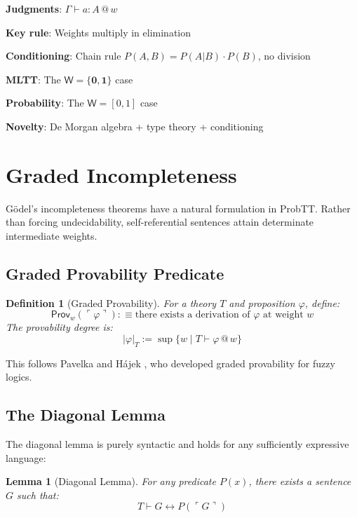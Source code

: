 \documentclass[11pt,a4paper]{article}
\makeatletter
\newtheorem{definition}{Definition}[section]
\newtheorem{lemma}[theorem]{Lemma}
\newcommand{\W}{\mathsf{W}}
\newcommand{\at}[1]{\,@\,#1}
\newcommand{\one}{\mathbf{1}}
\newcommand{\zero}{\mathbf{0}}
\makeatother
\begin{document}
\textbf{Judgments}: $\Gamma \vdash a : A \at{w}$

\textbf{Key rule}: Weights multiply in elimination

\textbf{Conditioning}: Chain rule $P(A,B) = P(A|B) \cdot P(B)$, no division

\textbf{MLTT}: The $\W = \{\zero, \one\}$ case

\textbf{Probability}: The $\W = {[0,1]}$ case

\textbf{Novelty}: De Morgan algebra + type theory + conditioning

\section{Graded Incompleteness}

G\"odel's incompleteness theorems have a natural formulation in ProbTT. Rather than forcing undecidability, self-referential sentences attain determinate intermediate weights.

\subsection{Graded Provability Predicate}

\begin{definition}[Graded Provability]
For a theory $T$ and proposition $\varphi$, define:
\[
\mathsf{Prov}_w(\ulcorner \varphi \urcorner) :\equiv \text{there exists a derivation of } \varphi \text{ at weight } w
\]
The \emph{provability degree} is:
\[
|\varphi|_T := \sup\{w \mid T \vdash \varphi \at{w}\}
\]
\end{definition}

This follows Pavelka \citep{pavelka1979fuzzy} and Hájek \citep{hajek1998metamathematics}, who developed graded provability for fuzzy logics.

\subsection{The Diagonal Lemma}

The diagonal lemma is purely syntactic and holds for any sufficiently expressive language:

\begin{lemma}[Diagonal Lemma]
For any predicate $P(x)$, there exists a sentence $G$ such that:
\[
T \vdash G \leftrightarrow P(\ulcorner G \urcorner)
\]
\end{lemma}
\end{document}
